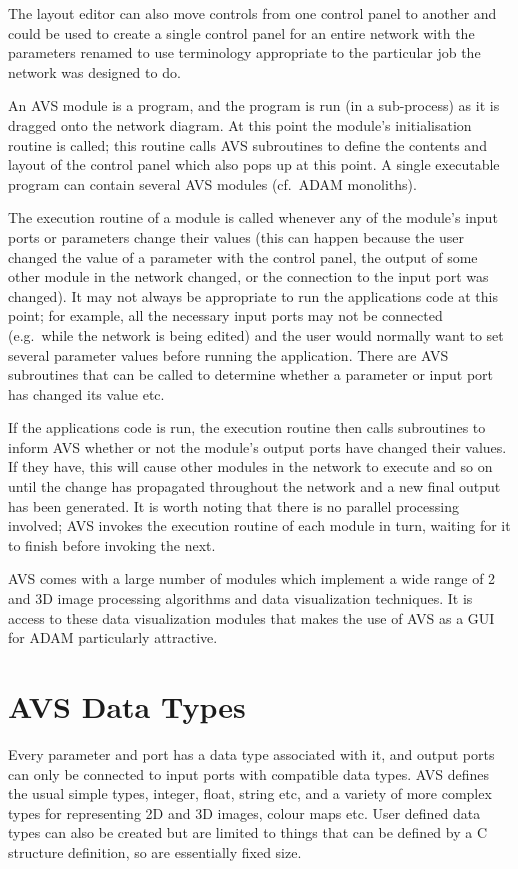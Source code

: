 The layout editor can also move controls from one control panel to another and
could be used to create a single control panel  for an entire network with the
parameters renamed to use terminology appropriate to the particular job the
network was designed to do.

An AVS module is a program, and the program is run (in a sub-process) as it is
dragged onto the network diagram. At this point the module's initialisation
routine is called; this routine calls AVS subroutines to define the contents
and layout of the control panel which also pops up at this point. A single
executable program can contain several AVS modules (cf.\ ADAM monoliths).

The execution routine of a module is called whenever any of the module's input
ports or parameters change their values (this can happen because the user
changed the value of a parameter with the control panel, the output of some
other module in the network changed, or the connection to the input port was
changed). It may not always be appropriate to run the applications code at this
point; for example, all the necessary input ports may not be connected (e.g.\
while the network is being edited) and the user would normally want to set
several parameter values before running the application. There are AVS
subroutines that can be called to determine whether a parameter or input port
has changed its value etc.

If the applications code is run, the execution routine then calls subroutines
to inform AVS whether or not the module's output ports have changed their
values. If they have, this  will cause other modules in the network to execute
and so on until the change  has propagated throughout the network and a new
final output has been  generated. It is worth noting that there is no parallel
processing involved;  AVS invokes the execution routine of each module in turn,
waiting for it to  finish before invoking the next.

AVS comes with a large number of modules which implement a wide range of 2 and
3D image processing algorithms and data visualization techniques. It is access
to these data visualization modules that makes the use of AVS as a GUI for ADAM
particularly attractive.

\section{AVS Data Types}

Every parameter and port has a data type associated with it, and output ports
can only be connected to input ports with compatible data types. AVS defines
the usual simple types, integer, float, string etc, and a variety of more
complex types for representing 2D and 3D images, colour maps etc. User defined
data types can also be created but are limited to things that can be defined by
a C structure definition, so are essentially fixed size.

